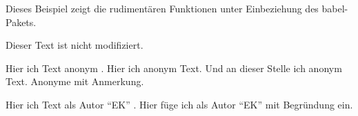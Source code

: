 \documentclass[ngerman]{article}
\begin{document}
 Dieses Beispiel zeigt die rudimentären Funktionen
 unter Einbeziehung des babel-Pakets.

 \listofchanges

 Dieser Text ist nicht modifiziert.

 Hier  ich Text anonym .
 Hier  ich anonym Text.
 Und an dieser Stelle  ich anonym Text.
 Anonyme  mit Anmerkung.

 Hier  ich Text als Autor "`EK"' .
 Hier füge ich 
 als Autor "`EK"' mit Begründung ein.
\end{document}
